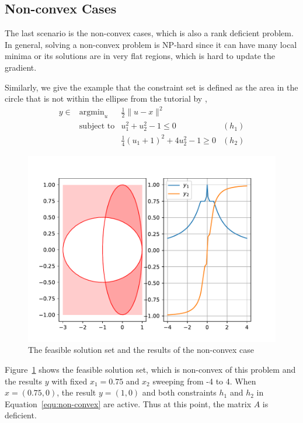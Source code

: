 \subsection{Non-convex Cases}
The last scenario is the non-convex cases, which is also a rank deficient problem. In general, solving a non-convex problem is NP-hard since it can have many local minima or its solutions are in very flat regions, which is hard to update the gradient. 
\par Similarly, we give the example that the constraint set is defined as the area in the circle that is not within the ellipse from the tutorial by \cite{SG:19},
\begin{equation}
    \label{equ:non-convex}
    \begin{array}{llll}
        y \in & \text{argmin}_u & \frac{1}{2} \|u - x\|^2 \\
        & \text{subject to} & u_1^2 + u_2^2 - 1 \leq 0 & (h_1) \\
        & & \frac{1}{4}(u_1 + 1)^2 + 4 u_2^2 - 1 \geq 0 & (h_2)
    \end{array}
\end{equation}
\begin{figure}[t]
    \label{fig:non-convex}
    \centering
    \includegraphics[page=1, width=.8\textwidth]{figs/nonconvex.pdf}
    \caption{The feasible solution set and the results of the non-convex case~\citep{SG:19}}
\end{figure}
\par Figure~\ref{fig:non-convex} shows the feasible solution set, which is non-convex of this problem and the results $y$ with fixed $x_1 =0.75$ and $x_2$ sweeping from -4 to 4. When $x = (0.75, 0)$, the result $y = (1, 0)$ and both constraints $h_1$ and $h_2$ in Equation~\ref{equ:non-convex} are active. Thus at this point, the matrix $A$ is deficient.
